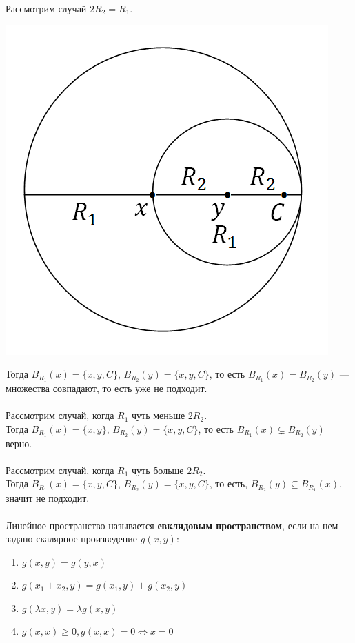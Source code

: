 \documentclass[12pt]{article}
\theoremstyle{definition}
\numberwithin{equation}{section}
\begin{document}
	Рассмотрим случай $2R_2 = R_1$. \begin{center}
		\includegraphics[scale=0.55]{l4_13.png}\end{center}
	Тогда $B_{R_1}(x) = \{x, y, C\}$, $B_{R_2}(y) = \{x, y, C\}$, то есть $B_{R_1}(x) = B_{R_2}(y)$ --- множества совпадают, то есть уже не подходит.\\
	\\
	Рассмотрим случай, когда $R_1$ чуть меньше $2R_2$.\\
	Тогда $B_{R_1}(x) = \{x, y\}$, $B_{R_2}(y) = \{x, y, C\}$, то есть $B_{R_1}(x) \subsetneq B_{R_2}(y)$ верно.\\
	\\
	Рассмотрим случай, когда $R_1$ чуть больше $2R_2$.\\
	Тогда $B_{R_1}(x) = \{x, y, C\}$, $B_{R_2}(y) = \{x, y, C\}$, то есть, $B_{R_2}(y) \subseteq B_{R_1}(x)$, значит не подходит.\\
	\\
	Линейное пространство называется \textbf{евклидовым пространством}, если на нем задано скалярное произведение $g(x, y)$:\begin{enumerate}
		\item $g(x, y) = g(y, x)$
		\item $g(x_1+x_2, y) = g(x_1, y)+g(x_2, y)$
		\item $g(\lambda x, y) = \lambda g(x, y)$
		\item $g(x, x) \geqslant 0, g(x, x) = 0 \Leftrightarrow x = 0$
	\end{enumerate}
\end{document}
